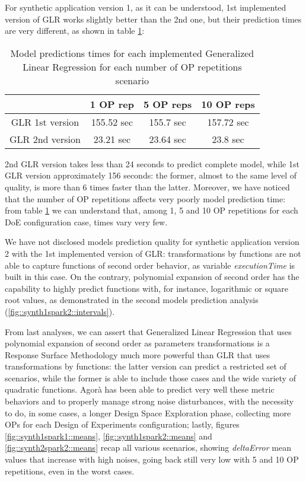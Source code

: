 For synthetic application version 1, as it can be understood, 1st implemented version of GLR works slightly better than the 2nd one, but their prediction times are very different, as shown in table \ref{tab::GLRtimes}:

\begin{table}[H]

    \centering
    
    \begin{tabular}{cccc}
    
        \toprule
         & 1 OP rep & 5 OP reps & 10 OP reps \\
        \midrule
        GLR 1st version & 155.52 sec & 155.7 sec & 157.72 sec \\
        GLR 2nd version & 23.21 sec & 23.64 sec & 23.8 sec \\
        \bottomrule 
    
    \end{tabular}

    \caption{Model predictions times for each implemented Generalized Linear Regression for each number of OP repetitions scenario}
    \label{tab::GLRtimes}
    
\end{table}

2nd GLR version takes less than 24 seconds to predict complete model, while 1st GLR version approximately 156 seconds: the former, almost to the same level of quality, is more than 6 times faster than the latter. Moreover, we have noticed that the number of OP repetitions affects very poorly model prediction time: from table \ref{tab::GLRtimes} we can understand that, among 1, 5 and 10 OP repetitions for each DoE configuration case, times vary very few.

We have not disclosed models prediction quality for synthetic application version 2 with the 1st implemented version of GLR: transformations by functions are not able to capture functions of second order behavior, as variable \textit{executionTime} is built in this case. On the contrary, polynomial expansion of second order has the capability to highly predict functions with, for instance, logarithmic or square root values, as demonstrated in the second models prediction analysis (\ref{fig::synth1spark2::intervals}).

From last analyses, we can assert that Generalized Linear Regression that uses polynomial expansion of second order as parameters transformations is a Response Surface Methodology much more powerful than GLR that uses transformations by functions: the latter version can predict a restricted set of scenarios, while the former is able to include those cases and the wide variety of quadratic functions. Agorà has been able to predict very well these metric behaviors and to properly manage strong noise disturbances, with the necessity to do, in some cases, a longer Design Space Exploration phase, collecting more OPs for each Design of Experiments configuration; lastly, figures \ref{fig::synth1spark1::means}, \ref{fig::synth1spark2::means} and \ref{fig::synth2spark2::means} recap all various scenarios, showing \textit{deltaError} mean values that increase with high noises, going back still very low with 5 and 10 OP repetitions, even in the worst cases.


